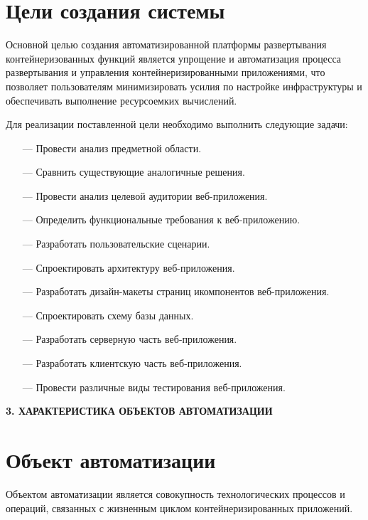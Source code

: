 \section{Цели создания системы}

Основной целью создания автоматизированной платформы развертывания контейнеризованных функций является упрощение и автоматизация процесса развертывания и управления контейнеризированными приложениями, что позволяет пользователям минимизировать усилия по настройке инфраструктуры и обеспечивать выполнение ресурсоемких вычислений.

Для реализации поставленной цели необходимо выполнить следующие задачи:

\begin{itemize}
\item[---]Провести анализ предметной области.
\item[---]Сравнить существующие аналогичные решения.
\item[---]Провести анализ целевой аудитории веб-приложения.
\item[---]Определить функциональные требования к веб-приложению.
\item[---]Разработать пользовательские сценарии.
\item[---]Спроектировать архитектуру веб-приложения.
\item[---]Разработать дизайн-макеты страниц икомпонентов веб-приложения.
\item[---]Спроектировать схему базы данных.
\item[---]Разработать серверную часть веб-приложения.
\item[---]Разработать клиентскую часть веб-приложения.
\item[---]Провести различные виды тестирования веб-приложения.
\end{itemize}

\newpage
\begin{center}
  \textbf{\large 3. ХАРАКТЕРИСТИКА ОБЪЕКТОВ АВТОМАТИЗАЦИИ}
\end{center}

\section{Объект автоматизации}

Объектом автоматизации является совокупность технологических процессов и операций, связанных с жизненным циклом контейнеризированных приложений.


